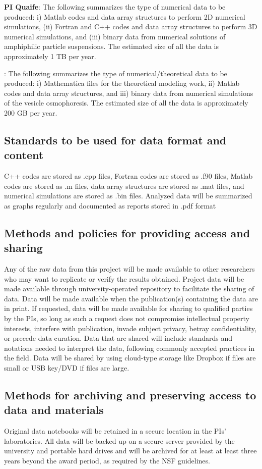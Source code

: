 \documentclass[11pt]{article}
\begin{document}
\noindent
{\bf PI Quaife}: The following summarizes the type of numerical data to
be produced: i) Matlab codes and data array structures to perform 2D
numerical simulations, (ii) Fortran and C++ codes and data array
structures to perform 3D numerical simulations, and (iii) binary data
from numerical solutions of amphiphilic particle suspensions. The
estimated size of all the data is approximately 1 TB per year. 

: The following summarizes the type of
numerical/theoretical data to be produced: i) Mathematica files for the
theoretical modeling work, ii) Matlab codes and data array structures,
and iii) binary data from numerical simulations of the vesicle
osmophoresis. The estimated size of all the data is approximately 200 GB
per year. 

\subsection*{Standards to be used for data format and content}
C++ codes are stored as .cpp files, Fortran codes are stored as .f90
files, Matlab codes are stored as .m files, data array structures are
stored as .mat files, and numerical simulations are stored as .bin
files. Analyzed data will be summarized as graphs regularly and
documented as reports stored in .pdf format 

\subsection*{Methods and policies for providing access and sharing}
Any of the raw data from this project will be made available to other
researchers who may want to replicate or verify the results obtained.
Project data will be made available through university-operated
repository to facilitate the sharing of data. Data will be made
available when the publication(s) containing the data are in print. If
requested, data will be made available for sharing to qualified parties
by the PIs, so long as such a request does not compromise intellectual
property interests, interfere with publication, invade subject privacy,
betray confidentiality, or precede data curation. Data that are shared
will include standards and notations needed to interpret the data,
following commonly accepted practices in the field. Data will be shared
by using cloud-type storage like Dropbox if files are small or USB
key/DVD if files are large. 

\subsection*{Methods for archiving and preserving access to data and
materials}
Original data notebooks will be retained in a secure location in the
PIs' laboratories. All data will be backed up on a secure server
provided by the university and portable hard drives and will be archived
for at least at least three years beyond the award period, as required
by the NSF guidelines.
\end{document}
